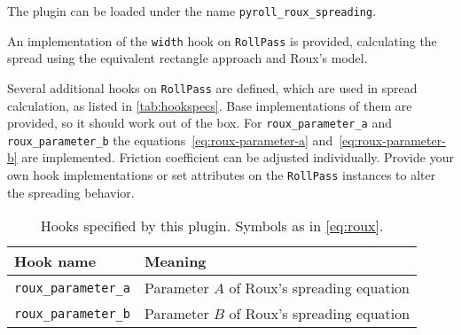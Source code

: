 \documentclass[11pt]{PyRollDocs}
\begin{document}
    The plugin can be loaded under the name \texttt{pyroll\_roux\_spreading}.

    An implementation of the \lstinline{width} hook on \lstinline{RollPass} is provided,
    calculating the spread using the equivalent rectangle approach and Roux's model.

    Several additional hooks on \lstinline{RollPass} are defined, which are used in spread calculation, as listed in \autoref{tab:hookspecs}.
    Base implementations of them are provided, so it should work out of the box.
    For \lstinline{roux_parameter_a} and \lstinline{roux_parameter_b} the equations~\ref{eq:roux-parameter-a} and~\ref{eq:roux-parameter-b} are implemented.
    Friction coefficient can be adjusted individually.
    Provide your own hook implementations or set attributes on the \lstinline{RollPass} instances to alter the spreading behavior.

    \begin{table}
        \centering
        \caption{Hooks specified by this plugin. Symbols as in \autoref{eq:roux}.}
        \label{tab:hookspecs}
        \begin{tabular}{ll}
            \toprule
            Hook name                     & Meaning                                      \\
            \midrule
            \texttt{roux\_parameter\_a}   & Parameter $A$ of Roux's spreading equation \\
            \texttt{roux\_parameter\_b}   & Parameter $B$ of Roux's spreading equation \\
            \bottomrule
        \end{tabular}
    \end{table}

    \printbibliography
\end{document}
